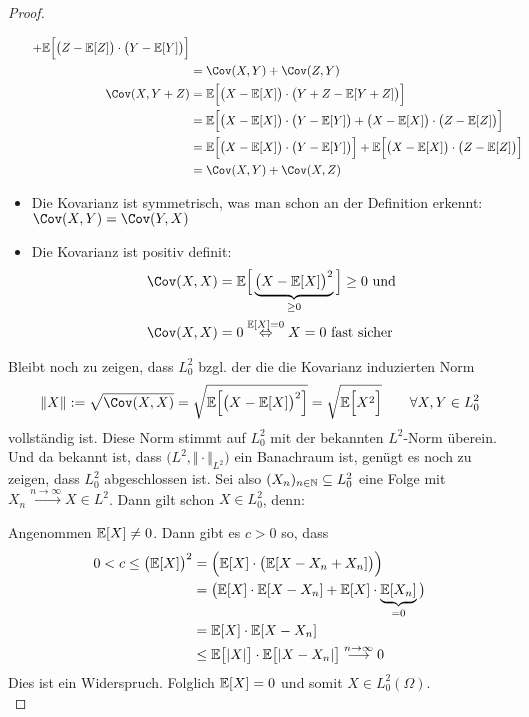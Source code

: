 \documentclass[12pt,a4paper]{article}
\begin{document}
\begin{proof}
\begin{itemize}
\begin{align*}
+\E\Big[\big(Z-\E[Z]\big)\cdot\big(Y-\E[Y]\big)\Big]\\
&=\Cov(X,Y)+\Cov(Z,Y)\\
\Cov(X,Y+Z)
&=\E\Big[\big(X-\E[X]\big)\cdot\big(Y+Z-\E[Y+Z]\big)\Big]\\
&=\E\Big[\big(X-\E[X]\big)\cdot\big(Y-\E[Y]\big)+\big(X-\E[X]\big)\cdot\big(Z-\E[Z]\big)\Big]\\
&=\E\Big[\big(X-\E[X]\big)\cdot\big(Y-\E[Y]\big)\Big]
+\E\Big[\big(X-\E[X]\big)\cdot\big(Z-\E[Z]\big)\Big]\\
&=\Cov(X,Y)+\Cov(X,Z)
\end{align*}
\item Die Kovarianz ist symmetrisch, was man schon an der Definition erkennt: $\Cov(X,Y)=\Cov(Y,X)$
\item Die Kovarianz ist positiv definit:
\begin{align*}
\Cov(X,X)&=\E\Big[\underbrace{\big(X-\E[X]\big)^2}_{\geq0}\Big]\geq0\text{ und}\\
\Cov(X,X)&=0\stackrel{\E[X]=0}{\gdw} X=0\text{ fast sicher}
\end{align*}
\end{itemize}
Bleibt noch zu zeigen, dass $L_0^2$ bzgl. der die die Kovarianz induzierten Norm
\begin{align*}
\Vert X\Vert:=\sqrt{\Cov(X,X)}
=\sqrt{\E\Big[\big(X-\E[X]\big)^2\Big]}
=\sqrt{\E\Big[X^2\Big]}
\qquad\forall X,Y\in L_0^2
\end{align*}
vollständig ist. Diese Norm stimmt auf $L_0^2$ mit der bekannten $L^2$-Norm überein. Und da bekannt ist, dass $\big(L^2,\Vert\cdot\Vert_{L^2}\big)$ ein Banachraum ist, genügt es noch zu zeigen, dass $L_0^2$ abgeschlossen ist.
Sei also $(X_n)_{n\in\mathbb{N}}\subseteq L_0^2$ eine Folge mit
$X_n\stackrel{n\to\infty}{\longrightarrow}X\in L^2$.
Dann gilt schon $X\in L_0^2$, denn:

Angenommen $\mathbb{E}[X]\neq0$. Dann gibt es $c>0$ so, dass
\begin{align*}
0<c\leq \big(\mathbb{E}[X]\big)^2&=\Big(\mathbb{E}[X]\cdot\big(\mathbb{E}[X-X_n+X_n]\big)\Big)\\
&=\big(\mathbb{E}[X]\cdot\mathbb{E}[X-X_n]+\mathbb{E}[X]\cdot\underbrace{\mathbb{E}[X_n]}_{=0}\big)\\
&=\mathbb{E}[X]\cdot\mathbb{E}[X-X_n]\\
&\leq\mathbb{E}\big[|X|\big]\cdot\mathbb{E}\big[|X-X_n|\big]
\stackrel{n\to\infty}{\longrightarrow}0
\end{align*}
Dies ist ein Widerspruch. Folglich $\mathbb{E}[X]=0$ und somit $X\in L_0^2(\Omega)$.\\


\end{proof}
\end{document}
